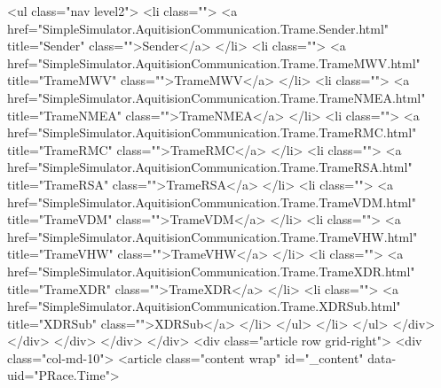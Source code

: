                         <ul class="nav level2">
                          <li class="">
                            <a href="SimpleSimulator.AquitisionCommunication.Trame.Sender.html" title="Sender" class="">Sender</a>
                          </li>
                          <li class="">
                            <a href="SimpleSimulator.AquitisionCommunication.Trame.TrameMWV.html" title="TrameMWV" class="">TrameMWV</a>
                          </li>
                          <li class="">
                            <a href="SimpleSimulator.AquitisionCommunication.Trame.TrameNMEA.html" title="TrameNMEA" class="">TrameNMEA</a>
                          </li>
                          <li class="">
                            <a href="SimpleSimulator.AquitisionCommunication.Trame.TrameRMC.html" title="TrameRMC" class="">TrameRMC</a>
                          </li>
                          <li class="">
                            <a href="SimpleSimulator.AquitisionCommunication.Trame.TrameRSA.html" title="TrameRSA" class="">TrameRSA</a>
                          </li>
                          <li class="">
                            <a href="SimpleSimulator.AquitisionCommunication.Trame.TrameVDM.html" title="TrameVDM" class="">TrameVDM</a>
                          </li>
                          <li class="">
                            <a href="SimpleSimulator.AquitisionCommunication.Trame.TrameVHW.html" title="TrameVHW" class="">TrameVHW</a>
                          </li>
                          <li class="">
                            <a href="SimpleSimulator.AquitisionCommunication.Trame.TrameXDR.html" title="TrameXDR" class="">TrameXDR</a>
                          </li>
                          <li class="">
                            <a href="SimpleSimulator.AquitisionCommunication.Trame.XDRSub.html" title="XDRSub" class="">XDRSub</a>
                          </li>
                        </ul>  </li>
                  </ul>        </div>
              </div>
            </div>
          </div>
        </div>
        <div class="article row grid-right">
          <div class="col-md-10">
            <article class="content wrap" id="_content" data-uid="PRace.Time">
  
